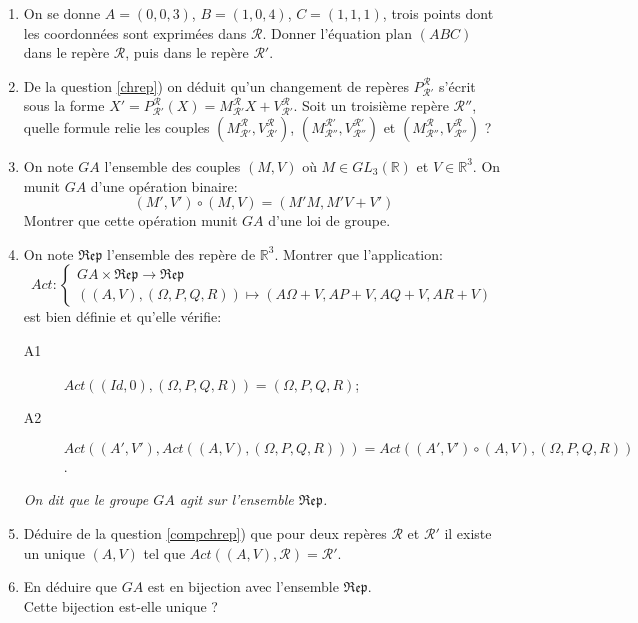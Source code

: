 \documentclass[a4paper,12pt,reqno]{amsart}
\begin{document}
\begin{exo}
\begin{enumerate}
    \item On se donne $A=(0, 0, 3)$, $B=(1, 0, 4)$, $C=(1, 1, 1)$, trois points dont les coordonnées sont exprimées dans $\mathcal{R}$. Donner l'équation plan $(ABC)$ dans le repère $\mathcal{R}$, puis dans le repère $\mathcal{R}'$.

    \item \label{compchrep} De la question \ref{chrep}) on déduit qu'un changement de repères $P_{\mathcal{R}'}^{\mathcal{R}}$ s'écrit sous la forme $X'=P_{\mathcal{R}'}^{\mathcal{R}}(X)=M_{\mathcal{R}'}^{\mathcal{R}}X+V_{\mathcal{R}'}^{\mathcal{R}}$. Soit un troisième repère $\mathcal{R}''$, quelle formule relie les couples $(M_{\mathcal{R}'}^{\mathcal{R}},V_{\mathcal{R}'}^{\mathcal{R}})$, $(M_{\mathcal{R}''}^{\mathcal{R}'},V_{\mathcal{R}''}^{\mathcal{R}'})$ et $(M_{\mathcal{R}''}^{\mathcal{R}},V_{\mathcal{R}''}^{\mathcal{R}})$ ?

    \item\hard On note $GA$ l'ensemble des couples $(M,V)$ où $M\in GL_{3}(\mathbb{R})$ et $V\in\mathbb{R}^{3}$. On munit $GA$ d'une opération binaire:\vspace{-3mm}
      \[
        (M',V')\circ(M,V)=(M'M,M'V+V')
      \]
    Montrer que cette opération munit $GA$ d'une loi de groupe.

    \item\hard On note $\mathfrak{Rep}$ l'ensemble des repère de $\mathbb{R}^{3}$. Montrer que l'application:
      \[
        Act:
        \begin{cases}
          GA \times \mathfrak{Rep} \rightarrow \mathfrak{Rep} \\
          \left((A,V),(\Omega,P,Q,R)\right) \mapsto (A\Omega+V,AP+V,AQ+V,AR+V)
        \end{cases}
      \]
    est bien définie et qu'elle vérifie:
    \begin{description}
      \item[A1] $Act\left((Id,0),(\Omega,P,Q,R)\right)=(\Omega,P,Q,R)$;

      \item[A2] $Act\left((A',V'),Act\left((A,V),(\Omega,P,Q,R)\right)\right) = Act\left((A',V')\circ(A,V),(\Omega,P,Q,R)\right)$.
    \end{description}
    \textit{On dit que le groupe $GA$ agit sur l'ensemble $\mathfrak{Rep}$.}

    \item\hard Déduire de la question \ref{compchrep}) que pour deux repères $\mathcal{R}$ et $\mathcal{R}'$ il existe un unique $(A,V)$ tel que $Act\left((A,V),\mathcal{R}\right)=\mathcal{R}'$.

    \item\hard En déduire que $GA$ est en bijection avec l'ensemble $\mathfrak{Rep}$. \\
    Cette bijection est-elle unique ?
  \end{enumerate}
\end{exo}
\end{document}
